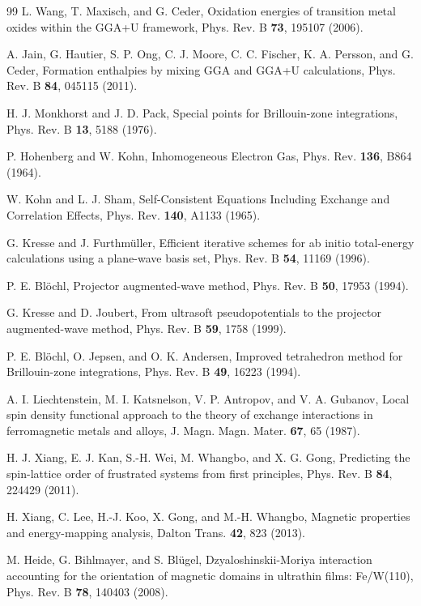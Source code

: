 \documentclass[aps,prb,preprint,superscriptaddress,longbibliography,nofootinbib]{revtex4-2}
\begin{document}
\begin{thebibliography}{99}
 L. Wang, T. Maxisch, and G. Ceder, Oxidation energies of transition metal oxides within the GGA+U framework, Phys. Rev. B \textbf{73}, 195107 (2006).

 A. Jain, G. Hautier, S. P. Ong, C. J. Moore, C. C. Fischer, K. A. Persson, and G. Ceder, Formation enthalpies by mixing GGA and GGA+U calculations, Phys. Rev. B \textbf{84}, 045115 (2011).

 H. J. Monkhorst and J. D. Pack, Special points for Brillouin-zone integrations, Phys. Rev. B \textbf{13}, 5188 (1976).

 P. Hohenberg and W. Kohn, Inhomogeneous Electron Gas, Phys. Rev. \textbf{136}, B864 (1964).

 W. Kohn and L. J. Sham, Self-Consistent Equations Including Exchange and Correlation Effects, Phys. Rev. \textbf{140}, A1133 (1965).

 G. Kresse and J. Furthm\"uller, Efficient iterative schemes for ab initio total-energy calculations using a plane-wave basis set, Phys. Rev. B \textbf{54}, 11169 (1996).

 P. E. Bl\"ochl, Projector augmented-wave method, Phys. Rev. B \textbf{50}, 17953 (1994).

 G. Kresse and D. Joubert, From ultrasoft pseudopotentials to the projector augmented-wave method, Phys. Rev. B \textbf{59}, 1758 (1999).

 P. E. Bl\"ochl, O. Jepsen, and O. K. Andersen, Improved tetrahedron method for Brillouin-zone integrations, Phys. Rev. B \textbf{49}, 16223 (1994).

 A. I. Liechtenstein, M. I. Katsnelson, V. P. Antropov, and V. A. Gubanov, Local spin density functional approach to the theory of exchange interactions in ferromagnetic metals and alloys, J. Magn. Magn. Mater. \textbf{67}, 65 (1987).

 H. J. Xiang, E. J. Kan, S.-H. Wei, M. Whangbo, and X. G. Gong, Predicting the spin-lattice order of frustrated systems from first principles, Phys. Rev. B \textbf{84}, 224429 (2011).

 H. Xiang, C. Lee, H.-J. Koo, X. Gong, and M.-H. Whangbo, Magnetic properties and energy-mapping analysis, Dalton Trans. \textbf{42}, 823 (2013).

 M. Heide, G. Bihlmayer, and S. Bl\"ugel, Dzyaloshinskii-Moriya interaction accounting for the orientation of magnetic domains in ultrathin films: Fe/W(110), Phys. Rev. B \textbf{78}, 140403 (2008).


\end{thebibliography}
\end{document}
